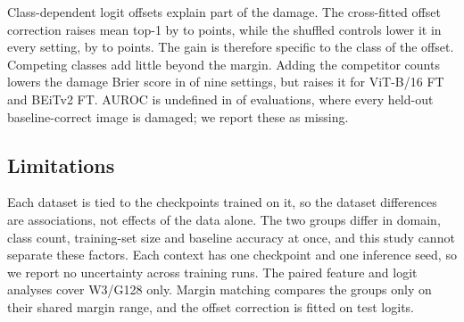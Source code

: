 Class-dependent logit offsets explain part of the damage.
The cross-fitted offset correction raises mean top-1 by  to  points, while the shuffled controls lower it in every setting, by  to  points.
The gain is therefore specific to the class of the offset.
Competing classes add little beyond the margin.
Adding the competitor counts lowers the damage Brier score in  of nine settings, but raises it for ViT-B/16 FT and BEiTv2 FT.
AUROC is undefined in  of  evaluations, where every held-out baseline-correct image is damaged; we report these as missing.

\subsection{Limitations}

Each dataset is tied to the checkpoints trained on it, so the dataset differences are associations, not effects of the data alone.
The two groups differ in domain, class count, training-set size and baseline accuracy at once, and this study cannot separate these factors.
Each context has one checkpoint and one inference seed, so we report no uncertainty across training runs.
The paired feature and logit analyses cover W3/G128 only.
Margin matching compares the groups only on their shared margin range, and the offset correction is fitted on test logits.
